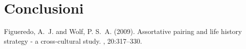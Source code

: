\documentclass[12pt]{article} %
\begin{document}










\section{Conclusioni} %



\begin{thebibliography}{99} %

Figueredo, A.~J. and Wolf, P. S.~A. (2009).
\newblock Assortative pairing and life history strategy - a cross-cultural
  study.
, 20:317--330.
 
\end{thebibliography}

\end{document}
